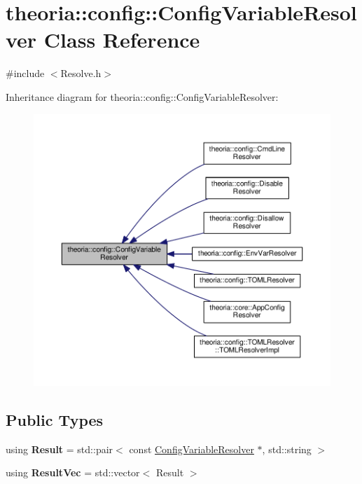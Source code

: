 \hypertarget{classtheoria_1_1config_1_1ConfigVariableResolver}{}\section{theoria\+:\+:config\+:\+:Config\+Variable\+Resolver Class Reference}
\label{classtheoria_1_1config_1_1ConfigVariableResolver}


{\ttfamily \#include $<$Resolve.\+h$>$}



Inheritance diagram for theoria\+:\+:config\+:\+:Config\+Variable\+Resolver\+:
\nopagebreak
\begin{figure}[H]
\begin{center}
\leavevmode
\includegraphics[width=350pt]{classtheoria_1_1config_1_1ConfigVariableResolver__inherit__graph}
\end{center}
\end{figure}
\subsection*{Public Types}
\begin{DoxyCompactItemize}
\item 
\mbox{\label{classtheoria_1_1config_1_1ConfigVariableResolver_af27a85262d802c9ad4ecb1179efaf447}} 
using {\bfseries Result} = std\+::pair$<$ const \hyperlink{classtheoria_1_1config_1_1ConfigVariableResolver}{Config\+Variable\+Resolver} $\ast$, std\+::string $>$
\item 
\mbox{\label{classtheoria_1_1config_1_1ConfigVariableResolver_a2d92a11d55181183ce4071566437f01b}} 
using {\bfseries Result\+Vec} = std\+::vector$<$ Result $>$
\end{DoxyCompactItemize}
